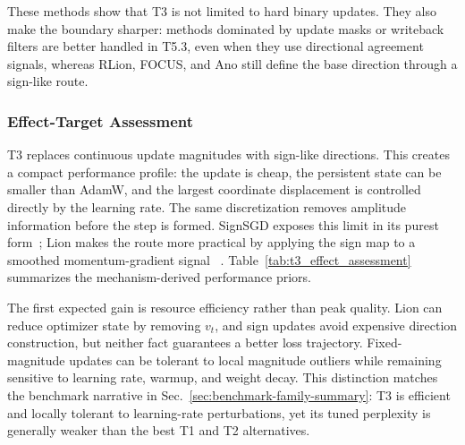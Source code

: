 These methods show that T3 is not limited to hard binary updates.  They also
make the boundary sharper: methods dominated by update masks or writeback
filters are better handled in T5.3, even when they use directional agreement
signals, whereas RLion, FOCUS, and Ano still define the base direction through
a sign-like route.

\subsubsection{Effect-Target Assessment}
\label{sec:t3-effect-assessment}

T3 replaces continuous update magnitudes with sign-like directions.  This
creates a compact performance profile: the update is cheap, the persistent
state can be smaller than AdamW, and the largest coordinate displacement is
controlled directly by the learning rate.  The same discretization removes
amplitude information before the step is formed.  SignSGD exposes this limit
in its purest form~\citep{bernstein2018signsgd}; Lion makes the route more
practical by applying the sign map to a smoothed momentum-gradient signal
~\citep{chen2023symbolic}.  Table~\ref{tab:t3_effect_assessment} summarizes
the mechanism-derived performance priors.



The first expected gain is resource efficiency rather than peak quality.  Lion
can reduce optimizer state by removing $v_t$, and sign updates avoid expensive
direction construction, but neither fact guarantees a better loss trajectory.
Fixed-magnitude updates can be tolerant to local magnitude outliers while
remaining sensitive to learning rate, warmup, and weight decay.  This
distinction matches the benchmark narrative in
Sec.~\ref{sec:benchmark-family-summary}: T3 is efficient and locally tolerant
to learning-rate perturbations, yet its tuned perplexity is generally weaker
than the best T1 and T2 alternatives.
